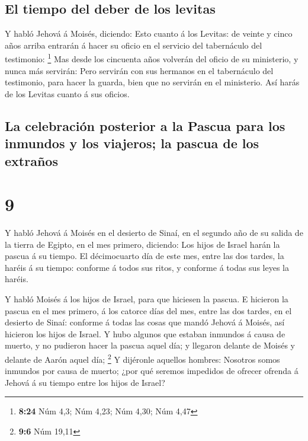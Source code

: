 \hypertarget{el-tiempo-del-deber-de-los-levitas}{%
\subsection{El tiempo del deber de los
levitas}\label{el-tiempo-del-deber-de-los-levitas}}

 Y habló Jehová á Moisés, diciendo:  Esto
cuanto á los Levitas: de veinte y cinco años arriba entrarán á hacer su
oficio en el servicio del tabernáculo del testimonio: \footnote{\textbf{8:24}
  Núm 4,3; Núm 4,23; Núm 4,30; Núm 4,47}  Mas desde los
cincuenta años volverán del oficio de su ministerio, y nunca más
servirán:  Pero servirán con sus hermanos en el
tabernáculo del testimonio, para hacer la guarda, bien que no servirán
en el ministerio. Así harás de los Levitas cuanto á sus oficios.

\hypertarget{la-celebraciuxf3n-posterior-a-la-pascua-para-los-inmundos-y-los-viajeros-la-pascua-de-los-extrauxf1os}{%
\subsection{La celebración posterior a la Pascua para los inmundos y los
viajeros; la pascua de los
extraños}\label{la-celebraciuxf3n-posterior-a-la-pascua-para-los-inmundos-y-los-viajeros-la-pascua-de-los-extrauxf1os}}

\hypertarget{section-8}{%
\section{9}\label{section-8}}

 Y habló Jehová á Moisés en el desierto de Sinaí, en el
segundo año de su salida de la tierra de Egipto, en el mes primero,
diciendo:  Los hijos de Israel harán la pascua á su
tiempo.  El décimocuarto día de este mes, entre las dos
tardes, la haréis á su tiempo: conforme á todos sus ritos, y conforme á
todas sus leyes la haréis.

 Y habló Moisés á los hijos de Israel, para que hiciesen
la pascua.  E hicieron la pascua en el mes primero, á los
catorce días del mes, entre las dos tardes, en el desierto de Sinaí:
conforme á todas las cosas que mandó Jehová á Moisés, así hicieron los
hijos de Israel.  Y hubo algunos que estaban inmundos á
causa de muerto, y no pudieron hacer la pascua aquel día; y llegaron
delante de Moisés y delante de Aarón aquel día; \footnote{\textbf{9:6}
  Núm 19,11}  Y dijéronle aquellos hombres: Nosotros somos
inmundos por causa de muerto; ¿por qué seremos impedidos de ofrecer
ofrenda á Jehová á su tiempo entre los hijos de Israel?

